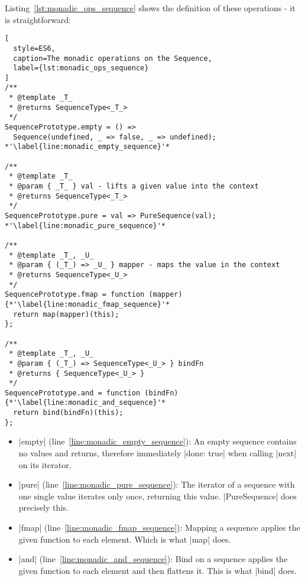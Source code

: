 Listing~\ref{lst:monadic_ops_sequence} shows the definition of these
operations - it is straightforward:
\begin{lstlisting}[
  style=ES6,
  caption=The monadic operations on the Sequence,
  label={lst:monadic_ops_sequence}
]
/**
 * @template _T_
 * @returns SequenceType<_T_>
 */
SequencePrototype.empty = () => 
  Sequence(undefined, _ => false, _ => undefined); *'\label{line:monadic_empty_sequence}'*

/**
 * @template _T_
 * @param { _T_ } val - lifts a given value into the context
 * @returns SequenceType<_T_>
 */
SequencePrototype.pure = val => PureSequence(val); *'\label{line:monadic_pure_sequence}'*

/**
 * @template _T_, _U_
 * @param { (_T_) => _U_ } mapper - maps the value in the context
 * @returns SequenceType<_U_>
 */
SequencePrototype.fmap = function (mapper) {*'\label{line:monadic_fmap_sequence}'*
  return map(mapper)(this); 
};

/**
 * @template _T_, _U_
 * @param { (_T_) => SequenceType<_U_> } bindFn
 * @returns { SequenceType<_U_> }
 */
SequencePrototype.and = function (bindFn) {*'\label{line:monadic_and_sequence}'*
  return bind(bindFn)(this); 
};
\end{lstlisting}

\begin{itemize}
  \item |empty| (line~\ref{line:monadic_empty_sequence}): An empty sequence
    contains no values and returns, therefore immediately |done: true| when
    calling |next| on its iterator.
  \item |pure| (line~\ref{line:monadic_pure_sequence}): The iterator of a
    sequence with one single value iterates only once, returning this value.
    |PureSequence| does precisely this.
  \item |fmap| (line~\ref{line:monadic_fmap_sequence}): Mapping a sequence
    applies the given function to each element. Which is what |map| does.
  \item |and| (line~\ref{line:monadic_and_sequence}): Bind on a sequence
    applies the given function to each element and then flattens it. This is
    what |bind| does.
\end{itemize}

